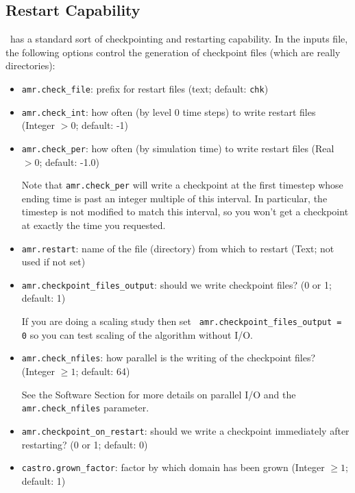 \subsection{Restart Capability}

\castro\ has a standard sort of checkpointing and restarting capability. 
In the inputs file, the following options control the generation of
checkpoint files (which are really directories):
\begin{itemize}
\item {\tt amr.check\_file}: prefix for restart files (text; default: {\tt chk}) 

\item {\tt amr.check\_int}: how often (by level 0 time steps) to write
   restart files (Integer $> 0$; default: -1)

\item {\tt amr.check\_per}: how often (by simulation time) to
  write restart files (Real $> 0$; default: -1.0)

  Note that {\tt amr.check\_per} will write a checkpoint at the first
  timestep whose ending time is past an integer multiple of this interval.
  In particular, the timestep is not modified to match this interval, so
  you won't get a checkpoint at exactly the time you requested.

\item {\tt amr.restart}: name of the file (directory) from which to restart
  (Text; not used if not set)

\item {\tt amr.checkpoint\_files\_output}: should we write checkpoint files? (0 or 1; default: 1)

  If you are doing a scaling study then set {\tt
  amr.checkpoint\_files\_output = 0} so you can test scaling of the
  algorithm without I/O.

\item {\tt amr.check\_nfiles}: how parallel is the writing of the checkpoint files?
  (Integer $\geq 1$; default: 64)

  See the Software Section for more details on parallel I/O and the 
  {\tt amr.check\_nfiles} parameter.

\item {\tt amr.checkpoint\_on\_restart}: should we write a checkpoint immediately after restarting?
  (0 or 1; default: 0)

\item {\tt castro.grown\_factor}: factor by which domain has been grown
  (Integer $\geq 1$; default: 1)
\end{itemize}



